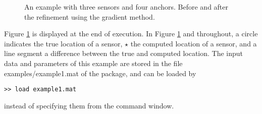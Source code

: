 \documentclass[12pt]{article}
\begin{document}
\begin{figure}
  \hspace{1mm}
\caption{An example with three sensors and four anchors. 
Before and after the refinement using the gradient method.}
\label{EG0}
\end{figure}

Figure \ref{EG0} is displayed  at the end of execution. In Figure \ref{EG0} and throughout,
a circle indicates the true location of a sensor, $\star$ the computed location of a sensor,
and a line segment a difference between  the true  and computed location.
The input data and parameters of this  example are stored in the file examples/example1.mat 
of the package, and can be loaded by
\begin{verbatim}
>> load example1.mat
\end{verbatim}
instead of specifying them from the command window. 
\end{document}
